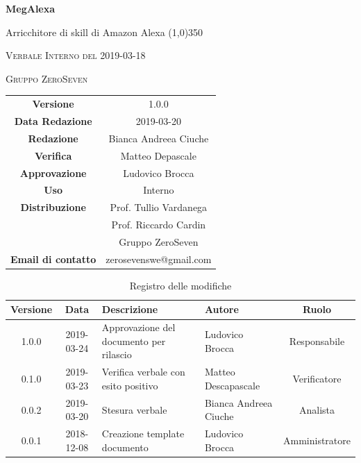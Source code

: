 \documentclass[a4paper,12pt]{article}
\author{Bianca Andreea Ciuche}
\date{2019-03-20}
\begin{document}
	\begin{titlepage}
		\centering
		{\huge\bfseries MegAlexa\par}
		Arricchitore di skill di Amazon Alexa
		\line(1,0){350} \\
		{\scshape\LARGE Verbale Interno del 2019-03-18 \par}
		\vspace{1cm}
		{\scshape Gruppo ZeroSeven \par}
		\logo
		\begin{tabular}{c|c}
			{\hfill \textbf{Versione}} 			& 1.0.0				\\
			{\hfill\textbf{Data Redazione}} 	& 2019-03-20		\\ 
			{\hfill\textbf{Redazione}} 			&  		Bianca Andreea Ciuche		\\ 
			{\hfill\textbf{Verifica}} 				&  	 Matteo Depascale \\ 
			{\hfill\textbf{Approvazione}} 		&  Ludovico Brocca\\ 
			{\hfill\textbf{Uso}} 					& 	Interno	\\ 
			{\hfill\textbf{Distribuzione}} 			& 			Prof. Tullio Vardanega \\ & Prof. Riccardo Cardin \\ & Gruppo ZeroSeven 	\\ 
			{\hfill\textbf{Email di contatto}} & zerosevenswe@gmail.com \\
		\end{tabular}
	\end{titlepage}
	
	
	
	\label{LastFrontPage}
	
	
	\newpage
	\cleardoublepage
	\begin{table}[tbph]
		\centering
		\begin{tabularx}{\textwidth}{|c|c|X|X|c|}
			\hline
			\textbf{Versione} & \textbf{Data} & \textbf{Descrizione} & \textbf{Autore} & \textbf{Ruolo} \\
			\hline
			1.0.0 & 2019-03-24 & Approvazione del documento per rilascio& Ludovico Brocca &  Responsabile \\
			\hline
			0.1.0 & 2019-03-23 & Verifica verbale con esito positivo & Matteo Descapascale  & Verificatore \\
			\hline
			0.0.2 & 2019-03-20 & Stesura verbale &Bianca Andreea Ciuche  & Analista \\
			\hline
			0.0.1 & 2018-12-08 & Creazione template documento & Ludovico Brocca & Amministratore\\
			\hline
		\end{tabularx}
		\caption{Registro delle modifiche}
	\end{table}
	\cleardoublepage
	\pagestyle{mymain}
	
\end{document}
